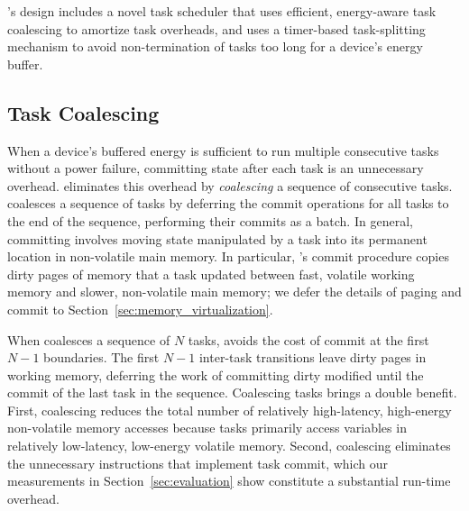 \sys's design includes a novel task scheduler that uses efficient,
energy-aware task coalescing to amortize task overheads, and uses a timer-based
task-splitting mechanism to avoid non-termination of tasks too long
for a device's energy buffer. 

\subsection{Task Coalescing}
\label{sec:task_coalescing}


When a device's buffered energy is sufficient to run multiple consecutive tasks
without a power failure, committing state after each task is an unnecessary
overhead.   \sys eliminates this overhead by {\em coalescing} a sequence of
consecutive tasks. \sys coalesces a sequence of tasks by deferring the commit
operations for all tasks to the end of the sequence, performing their commits
as a batch.  In general, committing involves moving state manipulated by a task
into its permanent location in non-volatile main memory.  In particular, \sys's
commit procedure copies dirty pages of memory that a task updated between fast,
volatile working memory and slower, non-volatile main memory; we defer the
details of paging and commit to Section~\ref{sec:memory_virtualization}.

When \sys coalesces a sequence of $N$ tasks, \sys avoids the cost of commit at
the first $N-1$ boundaries.   The first $N-1$ inter-task transitions leave
dirty pages in working memory, deferring the work of committing dirty modified
until the commit of the last task in the sequence.  Coalescing tasks brings a
double benefit. First, coalescing reduces the total number of relatively
high-latency, high-energy non-volatile memory accesses because tasks primarily
access variables in relatively low-latency, low-energy volatile memory.
Second, coalescing eliminates the unnecessary instructions that implement task
commit, which our measurements in Section~\ref{sec:evaluation} show constitute
a substantial run-time overhead.

 

